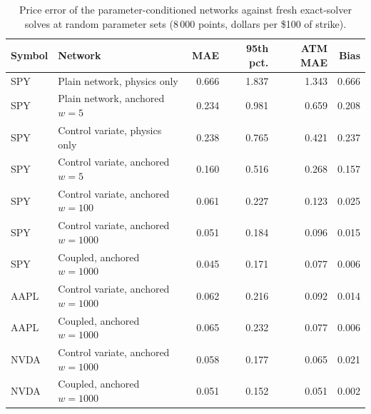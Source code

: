 \begin{table}[t]
\centering
\small
\caption{Price error of the parameter-conditioned networks against fresh exact-solver solves at random parameter sets (8\,000 points, dollars per \$100 of strike).}
\label{tab:accuracy}
\begin{tabular}{llrrrr}
\toprule
Symbol & Network & MAE & 95th pct. & ATM MAE & Bias \\
\midrule
SPY & Plain network, physics only & 0.666 & 1.837 & 1.343 & 0.666 \\
SPY & Plain network, anchored $w{=}5$ & 0.234 & 0.981 & 0.659 & 0.208 \\
SPY & Control variate, physics only & 0.238 & 0.765 & 0.421 & 0.237 \\
SPY & Control variate, anchored $w{=}5$ & 0.160 & 0.516 & 0.268 & 0.157 \\
SPY & Control variate, anchored $w{=}100$ & 0.061 & 0.227 & 0.123 & 0.025 \\
SPY & Control variate, anchored $w{=}1000$ & 0.051 & 0.184 & 0.096 & 0.015 \\
SPY & Coupled, anchored $w{=}1000$ & 0.045 & 0.171 & 0.077 & 0.006 \\
AAPL & Control variate, anchored $w{=}1000$ & 0.062 & 0.216 & 0.092 & 0.014 \\
AAPL & Coupled, anchored $w{=}1000$ & 0.065 & 0.232 & 0.077 & 0.006 \\
NVDA & Control variate, anchored $w{=}1000$ & 0.058 & 0.177 & 0.065 & 0.021 \\
NVDA & Coupled, anchored $w{=}1000$ & 0.051 & 0.152 & 0.051 & 0.002 \\
\bottomrule
\end{tabular}
\end{table}
